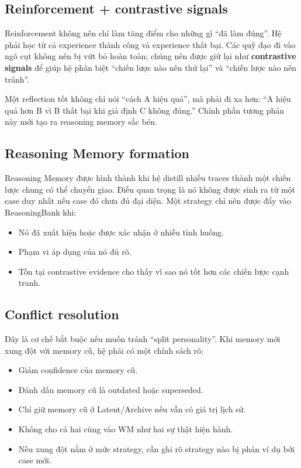 \documentclass[a4paper,12pt]{article}
\begin{document}
\subsection*{Reinforcement + contrastive signals}

Reinforcement không nên chỉ làm tăng điểm cho những gì ``đã làm đúng''. Hệ phải học từ cả experience thành công và experience thất bại. Các quỹ đạo đi vào ngõ cụt không nên bị vứt bỏ hoàn toàn; chúng nên được giữ lại như \textbf{contrastive signals} để giúp hệ phân biệt ``chiến lược nào nên thử lại'' và ``chiến lược nào nên tránh''. 

Một reflection tốt không chỉ nói ``cách A hiệu quả'', mà phải đi xa hơn: ``A hiệu quả hơn B vì B thất bại khi giả định C không đúng.'' Chính phần tương phản này mới tạo ra reasoning memory sắc bén.

\subsection*{Reasoning Memory formation}

Reasoning Memory được hình thành khi hệ distill nhiều traces thành một chiến lược chung có thể chuyển giao. Điều quan trọng là nó không được sinh ra từ một case duy nhất nếu case đó chưa đủ đại diện. Một strategy chỉ nên được đẩy vào ReasoningBank khi:
\begin{itemize}
    \item Nó đã xuất hiện hoặc được xác nhận ở nhiều tình huống.
    \item Phạm vi áp dụng của nó đủ rõ.
    \item Tồn tại contrastive evidence cho thấy vì sao nó tốt hơn các chiến lược cạnh tranh.
\end{itemize}

\subsection*{Conflict resolution}

Đây là cơ chế bắt buộc nếu muốn tránh ``split personality''. Khi memory mới xung đột với memory cũ, hệ phải có một chính sách rõ:
\begin{itemize}
    \item Giảm confidence của memory cũ.
    \item Đánh dấu memory cũ là outdated hoặc superseded.
    \item Chỉ giữ memory cũ ở Latent/Archive nếu vẫn có giá trị lịch sử.
    \item Không cho cả hai cùng vào WM như hai sự thật hiện hành.
    \item Nếu xung đột nằm ở mức strategy, cần ghi rõ strategy nào bị phản ví dụ bởi case mới.
\end{itemize}
\end{document}
